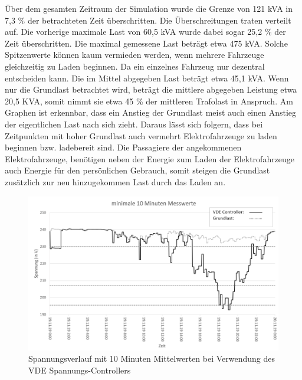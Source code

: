 Über dem gesamten  Zeitraum der Simulation wurde die Grenze von 121 kVA in 7,3 \% der betrachteten Zeit überschritten. Die Überschreitungen traten verteilt auf. Die vorherige maximale Last von 60,5 kVA wurde dabei sogar 25,2 \% der Zeit überschritten. Die maximal gemessene Last beträgt etwa 475 kVA. Solche Spitzenwerte können kaum vermieden werden, wenn mehrere Fahrzeuge gleichzeitig zu Laden beginnen. Da ein einzelnes Fahrzeug nur dezentral entscheiden kann. Die im Mittel abgegeben Last beträgt etwa 45,1 kVA. Wenn nur die Grundlast betrachtet wird, beträgt die mittlere abgegeben Leistung etwa 20,5 KVA, somit nimmt sie etwa 45 \% der mittleren Trafolast in Anspruch. Am Graphen ist erkennbar, dass ein Anstieg der Grundlast meist auch einen Anstieg der eigentlichen Last nach sich zieht. Daraus lässt sich folgern, dass bei Zeitpunkten mit hoher Grundlast auch vermehrt Elektrofahrzeuge zu laden beginnen bzw. ladebereit sind. Die Passagiere der angekommenen Elektrofahrzeuge, benötigen neben der Energie zum Laden der Elektrofahrzeuge auch Energie für den persönlichen Gebrauch, somit steigen die Grundlast zusätzlich zur neu hinzugekommen Last durch das Laden an. 

\begin{figure}[htb]
\centering
	\includegraphics[scale=0.7]{img/VDE_tau/Spannung10m5.png}
	\caption{Spannungsverlauf mit 10 Minuten Mittelwerten bei Verwendung des VDE Spannungs-Controllers}
	\label{Abb_VDEtauSpannung10m}
\end{figure}

